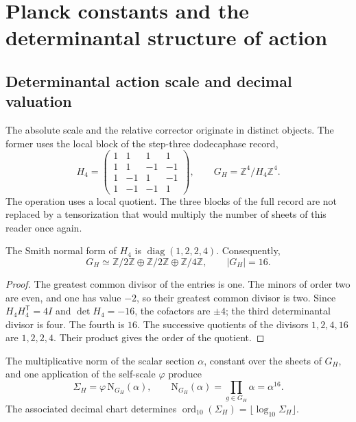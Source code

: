 \section{Planck constants and the determinantal structure of action}
\label{sec:action}
\subsection{Determinantal action scale and decimal valuation}

The absolute scale and the relative corrector originate in distinct
objects. The former uses the local block of the step-three
dodecaphase record,
\begin{equation}
 H_4=\begin{pmatrix}
 1&1&1&1\\1&1&-1&-1\\1&-1&1&-1\\1&-1&-1&1
 \end{pmatrix},\qquad
 G_H=\mathbb Z^4/H_4\mathbb Z^4.
 \label{eq:el-h4}
\end{equation}
The operation uses a local quotient. The three blocks of the full
record are not replaced by a tensorization that would multiply
the number of sheets of this reader once again.

\begin{lemma}
The Smith normal form of \(H_4\) is
\(\operatorname{diag}(1,2,2,4)\). Consequently,
\[
 G_H\simeq\mathbb Z/2\mathbb Z\oplus\mathbb Z/2\mathbb Z
 \oplus\mathbb Z/4\mathbb Z,\qquad |G_H|=16.
\]
\end{lemma}
\begin{proof}
The greatest common divisor of the entries is one. The minors of order two
are even, and one has value \(-2\), so their greatest common divisor
is two. Since \(H_4H_4^{\mathsf T}=4I\) and \(\det H_4=-16\), the
cofactors are \(\pm4\); the third determinantal divisor is four.
The fourth is \(16\). The successive quotients of the divisors
\(1,2,4,16\) are \(1,2,2,4\). Their product gives the order of the quotient.
\end{proof}

\begin{definition}
The multiplicative norm of the scalar section \(\alpha\), constant
over the sheets of \(G_H\), and one application of the self-scale
\(\varphi\) produce
\begin{equation}
 \Sigma_H=\varphi\,\mathrm N_{G_H}(\alpha),\qquad
 \mathrm N_{G_H}(\alpha)=\prod_{g\in G_H}\alpha=\alpha^{16}.
 \label{eq:el-lector-determinantal}
\end{equation}
The associated decimal chart determines
\(\operatorname{ord}_{10}(\Sigma_H)=\lfloor\log_{10}\Sigma_H\rfloor\).
\end{definition}

